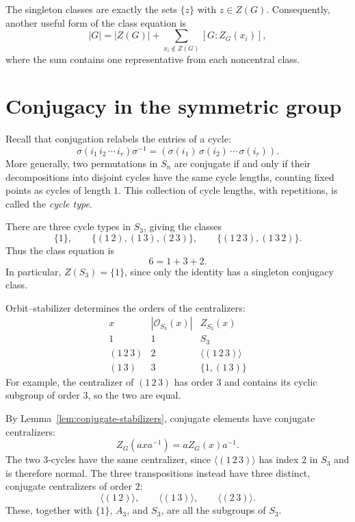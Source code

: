 \documentclass[reqno,11pt]{amsart}
\begin{document}
The singleton classes are exactly the sets $\{z\}$ with $z\in Z(G)$.
Consequently, another useful form of the class equation is
\[
  |G|=|Z(G)|+\sum_{x_i\notin Z(G)}[G:Z_G(x_i)],
\]
where the sum contains one representative from each noncentral class.

\section{Conjugacy in the symmetric group}

Recall that conjugation relabels the entries of a cycle:
\[
  \sigma(i_1\,i_2\,\cdots\,i_r)\sigma^{-1}
  =(\sigma(i_1)\,\sigma(i_2)\,\cdots\,\sigma(i_r)).
\]
More generally, two permutations in $S_n$ are conjugate if and only
if their decompositions into disjoint cycles have the same cycle
lengths, counting fixed points as cycles of length $1$. This collection
of cycle lengths, with repetitions, is called the \emph{cycle type}.

\begin{example}\label{ex:s3}
There are three cycle types in $S_3$, giving the classes
\[
  \{1\},\qquad
  \{(1\,2),(1\,3),(2\,3)\},\qquad
  \{(1\,2\,3),(1\,3\,2)\}.
\]
Thus the class equation is
\[
  6=1+3+2.
\]
In particular, $Z(S_3)=\{1\}$, since only the identity has a
singleton conjugacy class.
\end{example}

\begin{example}[Centralizers in $S_3$]
Orbit--stabilizer determines the orders of the centralizers:
\[
\begin{array}{c|c|c}
  x & |\mathcal{O}_{S_3}(x)| & Z_{S_3}(x)\\ \hline
  1 & 1 & S_3\\[2pt]
  (1\,2\,3) & 2 & \langle(1\,2\,3)\rangle\\[2pt]
  (1\,3) & 3 & \{1,(1\,3)\}
\end{array}
\]
For example, the centralizer of $(1\,2\,3)$ has order $3$ and
contains its cyclic subgroup of order $3$, so the two are equal.

By Lemma~\ref{lem:conjugate-stabilizers}, conjugate elements have
conjugate centralizers:
\[
  Z_G(axa^{-1})=aZ_G(x)a^{-1}.
\]
The two $3$-cycles have the same centralizer, since
$\langle(1\,2\,3)\rangle$ has index $2$ in $S_3$ and is therefore normal. The three transpositions instead have three
distinct, conjugate centralizers of order $2$:
\[
  \langle(1\,2)\rangle,\qquad
  \langle(1\,3)\rangle,\qquad
  \langle(2\,3)\rangle.
\]
These, together with $\{1\}$, $A_3$, and $S_3$, are all the
subgroups of $S_3$.
\end{example}
\end{document}

